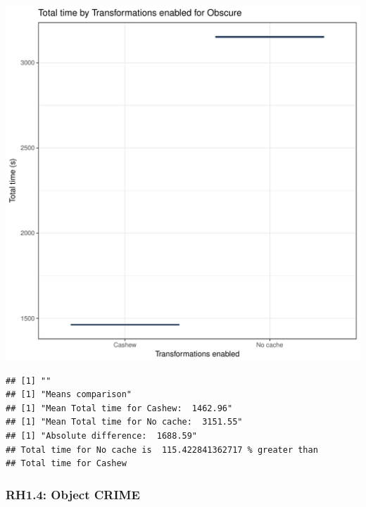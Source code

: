 \documentclass{article}\usepackage[]{graphicx}\usepackage[]{color}
\makeatletter
\def\maxwidth{ %
  \ifdim\Gin@nat@width>\linewidth
    \linewidth
  \else
    \Gin@nat@width
  \fi
}
\newenvironment{kframe}{%
 \def\at@end@of@kframe{}%
 \ifinner\ifhmode%
  \def\at@end@of@kframe{\end{minipage}}%
  \begin{minipage}{\columnwidth}%
 \fi\fi%
 \def\FrameCommand##1{\hskip\@totalleftmargin \hskip-\fboxsep
 \colorbox{shadecolor}{##1}\hskip-\fboxsep
     \hskip-\linewidth \hskip-\@totalleftmargin \hskip\columnwidth}%
 \MakeFramed {\advance\hsize-\width
   \@totalleftmargin\z@ \linewidth\hsize
   \@setminipage}}%
 {\par\unskip\endMakeFramed%
 \at@end@of@kframe}
\newenvironment{knitrout}{}{} %
\makeatother
\begin{document}
\begin{knitrout}
\color{fgcolor}
\includegraphics[width=\maxwidth]{figure/RH1_obscure-1} 
\begin{kframe}

{\ttfamily\noindent\bfseries\color{errorcolor}{\#\# Error in eval(expr, envir, enclos): object 'shap\_cashew\_obscure' not found}}\begin{verbatim}
## [1] ""
## [1] "Means comparison"
## [1] "Mean Total time for Cashew:  1462.96"
## [1] "Mean Total time for No cache:  3151.55"
## [1] "Absolute difference:  1688.59"
## Total time for No cache is  115.422841362717 % greater than 
## Total time for Cashew
\end{verbatim}
\end{kframe}
\end{knitrout}


\subsubsection{RH1.4: Object CRIME}
\end{document}
